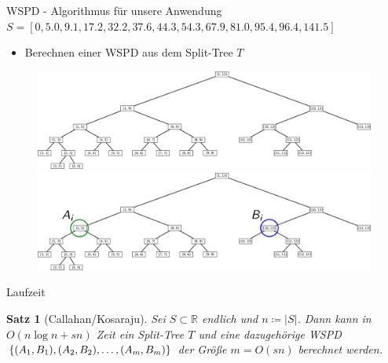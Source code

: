 \documentclass{beamer}
\newtheorem{thm}{Satz}
\begin{document}
	\begin{frame}[t]{WSPD - Algorithmus für unsere Anwendung}
		$S = [0, 5.0, 9.1, 17.2, 32.2, 37.6, 44.3, 54.3, 67.9, 81.0, 95.4, 96.4, 141.5]$
		\begin{itemize}
			\item Berechnen einer WSPD aus dem Split-Tree $T$
		\end{itemize}
		\begin{figure}
			\centering
			\def \svgwidth{\textwidth}
			\begin{overprint}
				\includegraphics[width=\textwidth]{split_tree.png}
				\onslide<2->\includegraphics[width=\textwidth]{split_tree_2_wspd.png}
			\end{overprint}
		\end{figure}
	\end{frame}

	\begin{frame}{Laufzeit}
		\begin{thm}[Callahan/Kosaraju]
			Sei $S \subset \mathbb{R}$ endlich und $n \coloneqq |S|$. Dann kann in $O(n \log n + sn)$ Zeit ein Split-Tree $T$ und eine dazugehörige WSPD $\{(A_1, B_1), (A_2, B_2), \mathellipsis, (A_m, B_m)\}$ der Größe $m = O(sn)$ berechnet werden.
		\end{thm}
	\end{frame}
	
\end{document}
